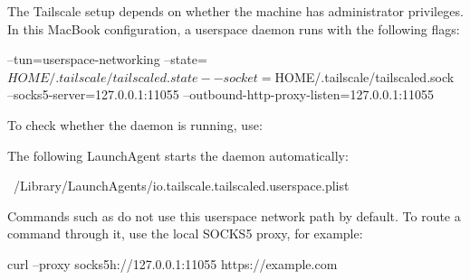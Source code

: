 
\label{sec:tailscale-setup}
The Tailscale setup depends on whether the machine has administrator privileges.
In this MacBook configuration, a userspace  daemon runs with the following flags:
\begin{DocCode}
    --tun=userspace-networking
    --state=$HOME/.tailscale/tailscaled.state
    --socket=$HOME/.tailscale/tailscaled.sock
    --socks5-server=127.0.0.1:11055
    --outbound-http-proxy-listen=127.0.0.1:11055
\end{DocCode}
To check whether the daemon is running, use:
The following LaunchAgent starts the daemon automatically:
\begin{DocCode}
    ~/Library/LaunchAgents/io.tailscale.tailscaled.userspace.plist
\end{DocCode}

Commands such as  do not use this userspace network path by default.
To route a command through it, use the local SOCKS5 proxy, for example:
\begin{DocCode}
    curl --proxy socks5h://127.0.0.1:11055 https://example.com
\end{DocCode}

